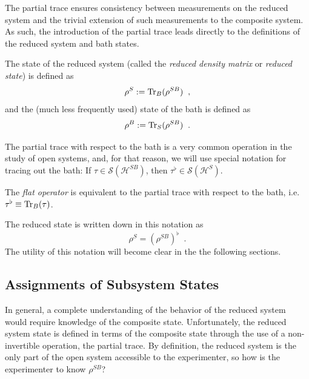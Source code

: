 The partial trace ensures consistency between measurements on the reduced system and the trivial extension of such measurements to the composite system.  As such, the introduction of the partial trace leads directly to the definitions of the reduced system and bath states.
\begin{definition}
The state of the reduced system (called the {\em reduced density matrix} or {\em reduced state}) is defined as
$$
\rho^S:=\operatorname{Tr}_B(\rho^{SB})\;\;,
$$
and the (much less frequently used) state of the bath is defined as
$$
\rho^B:=\operatorname{Tr}_S(\rho^{SB})\;\;.
$$
\end{definition}

The partial trace with respect to the bath is a very common operation in the study of open systems, and, for that reason, we will use special notation for tracing out the bath: If $\tau\in\mathcal{S}(\mathcal{H}^{SB})$, then $\tau^\flat\in\mathcal{S}(\mathcal{H}^S)$.  
\begin{definition}
The {\em flat operator} is equivalent to the partial trace with respect to the bath, i.e.\ $\tau^\flat\equiv\operatorname{Tr}_B(\tau)$.  
\end{definition}

The reduced state is written down in this notation as
$$
\rho^S = (\rho^{SB})^\flat\;\;.
$$
The utility of this notation will become clear in the the following sections.  

\subsection{Assignments of Subsystem States}
\label{sec:sharpop}

In general, a complete understanding of the behavior of the reduced system would require knowledge of the composite state.  Unfortunately, the reduced system state is defined in terms of the composite state through the use of a non-invertible operation, the partial trace.  By definition, the reduced system is the only part of the open system accessible to the experimenter, so how is the experimenter to know $\rho^{SB}$?  

